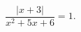 \begin{ex}[type=equation]
	\begin{condition}
		$\dfrac{\big |x +3\big|}{x^2 + 5x + 6} = 1.$
	\end{condition}
\end{ex}